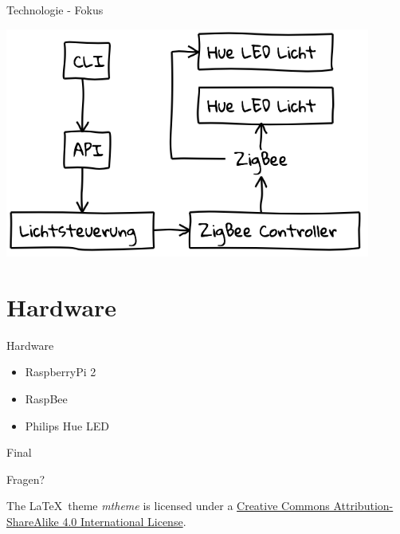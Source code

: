 \documentclass[10pt, compress]{beamer}
\begin{document}
\begin{frame}{Technologie - Fokus}
  \begin{center}
    \includegraphics[width=0.9\textwidth]{images/realworld}
  \end{center}
\end{frame}

\section{Hardware}

\begin{frame}{Hardware}
  \begin{itemize}
    \item RaspberryPi 2
	\item RaspBee
	\item Philips Hue LED
  \end{itemize}
\end{frame}

\begin{frame}{Final}

  \begin{center}\huge Fragen?\end{center}
    
  \vspace{1cm}
  \begin{center}
  {\small

  The \LaTeX \ theme \emph{mtheme} is licensed under a
  \href{http://creativecommons.org/licenses/by-sa/4.0/}{Creative Commons
  Attribution-ShareAlike 4.0 International License}.}

  \ccbysa
  
  \end{center}

\end{frame}
\end{document}
